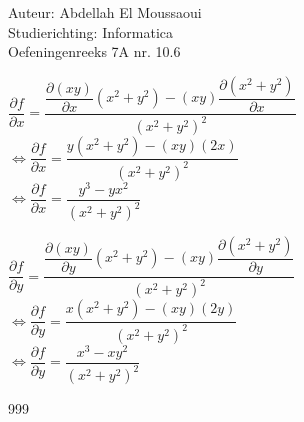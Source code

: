 \documentclass[a4paper]{article}
\begin{document}
  
\noindent \large Auteur: Abdellah El Moussaoui \\
\noindent \large Studierichting: Informatica\\
\noindent \large Oefeningenreeks 7A nr. 10.6\\

\medskip

\normalsize

$\dfrac{\partial f}{\partial x} = \dfrac{\dfrac{\partial(xy)}{\partial x} (x^2 + y^2) - (xy) \dfrac{\partial (x^2 + y^2)}{\partial x} }{(x^2 + y^2)^2}$\\

$\Leftrightarrow \dfrac{\partial f}{\partial x} = \dfrac{y (x^2 + y^2) - (xy)(2x)}{(x^2 + y^2)^2}$\\

$\Leftrightarrow \dfrac{\partial f}{\partial x} = \dfrac{y^3 - yx^2}{(x^2 + y^2)^2}$\\

\medskip

$\dfrac{\partial f}{\partial y} = \dfrac{\dfrac{\partial(xy)}{\partial y} (x^2 + y^2) - (xy) \dfrac{\partial (x^2 + y^2)}{\partial y} }{(x^2 + y^2)^2}$\\

$\Leftrightarrow \dfrac{\partial f}{\partial y} = \dfrac{x (x^2 + y^2) - (xy)(2y)}{(x^2 + y^2)^2}$\\

$\Leftrightarrow \dfrac{\partial f}{\partial y} = \dfrac{x^3 - xy^2}{(x^2 + y^2)^2}$\\

\begin{thebibliography}{999}
\end{thebibliography}
\end{document}
